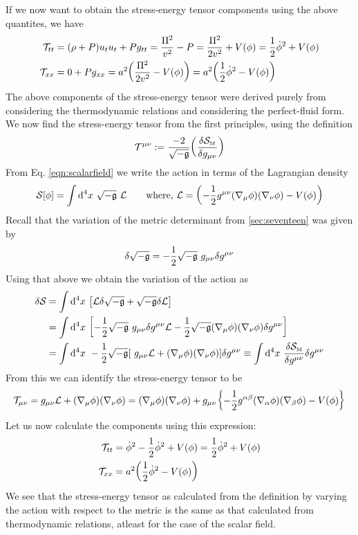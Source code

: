 If we now want to obtain the stress-energy tensor components using the above quantites, we have 
\begin{align*}
    \mathcal T_{tt} &= (\rho + P) u_t u_t +Pg_{tt} = \frac{\Pi^2}{v^2} -P = \frac{\Pi^2}{2v^2} +V(\phi) = \frac{1}{2}\dot{\phi}^2 + V(\phi)\\
\mathcal T_{xx} &= 0 + Pg_{xx} = a^2 \qty(\frac{\Pi^2}{2v^2} - V(\phi))   = a^2\qty( \frac{1}{2}\dot{\phi}^2 - V(\phi))
\end{align*}
The above components of the stress-energy tensor were derived purely from considering the thermodynamic relations and considering the perfect-fluid form. We now find the stress-energy tensor from the first principles, using the definition 
$$\mathcal T^{\mu\nu} := \frac{-2}{\sqrt{-\mathfrak{g}}}\qty(\frac{\delta \mathcal S_{\text{\tiny M}}}{\delta g_{\mu\nu}})$$
From Eq. \ref{eqn:scalarfield} we write the action in terms of the Lagrangian density 
$$\mathcal S[\phi] = \int \dd^4 x\ \sqrt{-\mathfrak{g}}\ \mathcal L\qquad \text{where, } \mathcal L = \qty(-\frac{1}{2}g^{\mu\nu}(\nabla_{\mu} \phi)(\nabla_{\nu} \phi) - V(\phi))$$ 
Recall that the variation of the metric determinant from \ref{sec:seventeen} was given by $$\delta \sqrt{-\mathfrak{g}} = -\frac{1}{2}\sqrt{-\mathfrak{g}}\ g_{\mu\nu} \delta g^{\mu\nu}$$ 
Using that above we obtain the variation of the action as 
\begin{align*}
    \delta \mathcal S &= \int \dd^4 x \ \qty[\mathcal L \delta \sqrt{-\mathfrak{g}} + \sqrt{-\mathfrak{g}} \delta \mathcal L ]\\
    &=\int \dd^4 x \ \qty[-\frac{1}{2}\sqrt{-\mathfrak{g}}\ g_{\mu\nu} \delta g^{\mu\nu}\mathcal L -\frac{1}{2}\sqrt{-\mathfrak{g}}\qty(\nabla_{\mu}\phi)\qty(\nabla_{\nu}\phi)\delta g^{\mu \nu} ]\\
    &=\int \dd^4 x \ -\frac{1}{2}\sqrt{-\mathfrak{g}}\qty[\ g_{\mu\nu} \mathcal L+ \qty(\nabla_{\mu}\phi)\qty(\nabla_{\nu}\phi) ]\delta g^{\mu\nu}\equiv \int \dd^4x \ \frac{\delta \mathcal S_{\text{\tiny M}}}{\delta g^{\mu\nu}} \delta g^{\mu\nu}
\end{align*}
From this we can identify the stress-energy tensor to be 
$$\mathcal T_{\mu\nu} = g_{\mu\nu}\mathcal L +\qty(\nabla_{\mu}\phi)\qty(\nabla_{\nu}\phi) =\qty(\nabla_{\mu}\phi)\qty(\nabla_{\nu}\phi) + g_{\mu\nu} \qty{-\frac{1}{2}g^{\alpha\beta}\qty(\nabla_{\alpha}\phi)\qty(\nabla_{\beta}\phi) - V(\phi)}$$
Let us now calculate the components using this expression: 
\begin{align*}
    \mathcal T_{tt} &= \dot{\phi}^2 - \frac{1}{2}\dot{\phi}^2 +V(\phi) =   \frac{1}{2}\dot{\phi}^2 +V(\phi) \\
\mathcal T_{xx} &= a^2\qty( \frac{1}{2}\dot{\phi}^2 -V(\phi))
\end{align*}
We see that the stress-energy tensor as calculated from the definition by varying the action with respect to the metric is the same as that calculated from thermodynamic relations, atleast for the case of the scalar field.